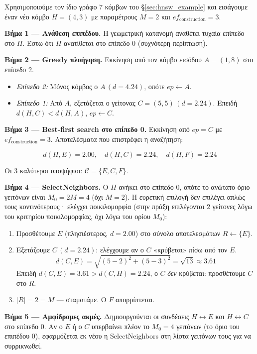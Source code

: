 \documentclass[12pt,a4paper]{article}
\begin{document}
Χρησιμοποιούμε τον ίδιο γράφο 7 κόμβων του §\ref{sec:hnsw_example} και εισάγουμε έναν νέο κόμβο $H = (4, 3)$ με παραμέτρους $M = 2$ και $ef_{\text{construction}} = 3$.

\textbf{Βήμα 1 — Ανάθεση επιπέδου.} Η γεωμετρική κατανομή αναθέτει τυχαία επίπεδο στο $H$. Έστω ότι $H$ ανατίθεται στο επίπεδο 0 (συχνότερη περίπτωση).

\textbf{Βήμα 2 — Greedy πλοήγηση.} Εκκίνηση από τον κόμβο εισόδου $A = (1,8)$ στο επίπεδο 2.
\begin{itemize}
    \item \textit{Επίπεδο 2:} Μόνος κόμβος ο $A\,(d=4.24)$, οπότε $ep \leftarrow A$.
    \item \textit{Επίπεδο 1:} Από $A$, εξετάζεται ο γείτονας $C = (5,5)\,(d=2.24)$. Επειδή $d(H,C) < d(H,A)$, $ep \leftarrow C$.
\end{itemize}

\textbf{Βήμα 3 — Best-first search στο επίπεδο 0.} Εκκίνηση από $ep = C$ με $ef_{\text{construction}} = 3$. Αποτελέσματα που επιστρέφει η αναζήτηση:

\[
d(H,E) = 2.00,\quad d(H,C) = 2.24,\quad d(H,F) = 2.24
\]

Οι 3 καλύτεροι υποψήφιοι: $\mathcal{C} = \{E, C, F\}$.

\textbf{Βήμα 4 — SelectNeighbors.} Ο $H$ ανήκει στο επίπεδο 0, οπότε το ανώτατο όριο γειτόνων είναι $M_0 = 2M = 4$ (όχι $M = 2$). Η ευρετική επιλογή δεν επιλέγει απλώς τους κοντινότερους· ελέγχει ποικιλομορφία (στην πράξη επιλέγονται 2 γείτονες λόγω του κριτηρίου ποικιλομορφίας, όχι λόγω του ορίου $M_0$):

\begin{enumerate}
    \item Προσθέτουμε $E$ (πλησιέστερος, $d=2.00$) στο σύνολο αποτελεσμάτων $R \leftarrow \{E\}$.
    \item Εξετάζουμε $C\,(d=2.24)$: ελέγχουμε αν ο $C$ «κρύβεται» πίσω από τον $E$.
        \[ d(C, E) = \sqrt{(5{-}2)^2 + (5{-}3)^2} = \sqrt{13} \approx 3.61 \]
        Επειδή $d(C,E) = 3.61 > d(C,H) = 2.24$, ο $C$ \emph{δεν} κρύβεται: προσθέτουμε $C$ στο $R$.
    \item $|R| = 2 = M$ — σταματάμε. Ο $F$ απορρίπτεται.
\end{enumerate}

\textbf{Βήμα 5 — Αμφίδρομες ακμές.} Δημιουργούνται οι συνδέσεις $H \leftrightarrow E$ και $H \leftrightarrow C$ στο επίπεδο 0. Αν ο $E$ ή ο $C$ υπερβαίνει πλέον το $M_0 = 4$ γειτόνων (το όριο του επιπέδου 0), εφαρμόζεται εκ νέου η SelectNeighbors στη λίστα γειτόνων τους για να συρρικνωθεί.
\end{document}
